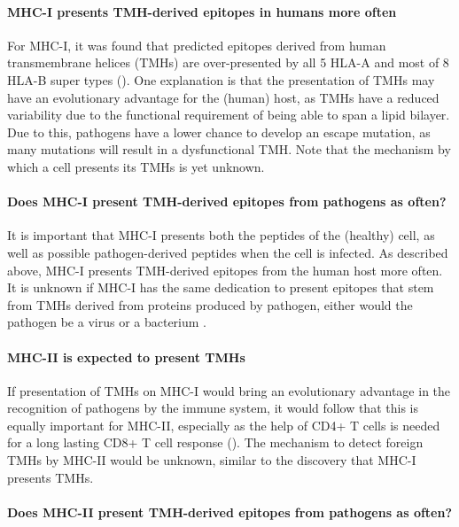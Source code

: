 \paragraph{MHC-I presents TMH-derived epitopes in humans more often}

For MHC-I, it was found that predicted epitopes derived 
from human transmembrane helices (TMHs)
are over-presented by all 5 HLA-A and 
most of 8 HLA-B super types (\cite{bianchi2017}).
One explanation is that the presentation of TMHs 
may have an evolutionary advantage for 
the (human) host, as TMHs have a reduced variability 
due to the functional requirement of being able to span a lipid bilayer. 
Due to this, pathogens have a lower chance to develop an escape mutation,
as many mutations will result in a dysfunctional TMH.
Note that the mechanism by which a cell presents its TMHs is
yet unknown.

\paragraph{Does MHC-I present TMH-derived epitopes from pathogens as often?}

It is important that MHC-I presents both the peptides of the 
(healthy) cell, as well as possible pathogen-derived peptides when the
cell is infected. As described above, MHC-I presents TMH-derived epitopes 
from the human host more often. It is unknown if MHC-I has the same
dedication to present epitopes that stem from TMHs derived from
proteins produced by pathogen, either would the pathogen
be a virus  or 
a bacterium .

\paragraph{MHC-II is expected to present TMHs}

If presentation of TMHs on MHC-I would bring an evolutionary advantage 
in the recognition of pathogens by the immune system, 
it would follow that this is equally important for MHC-II, 
especially as the help of CD4+ T cells is needed for a long lasting CD8+ T cell 
response (\cite{novy2007cd4}). 
The mechanism to detect foreign TMHs by MHC-II would be unknown, 
similar to the discovery that MHC-I presents TMHs.

\paragraph{Does MHC-II present TMH-derived epitopes from pathogens as often?}

